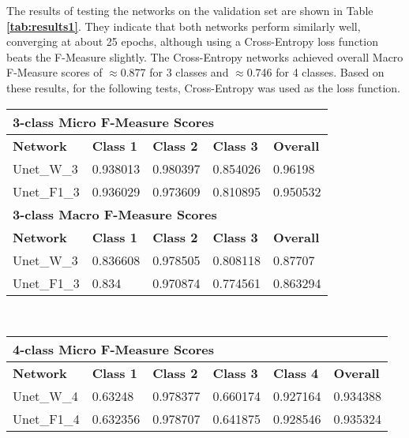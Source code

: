 \noindent The results of testing the networks on the validation set are shown in Table \textbf{\ref{tab:results1}}. They indicate that both networks perform similarly well, converging at about 25 epochs, although using a Cross-Entropy loss function beats the F-Measure slightly. The Cross-Entropy networks achieved overall Macro F-Measure scores of $\approx$0.877 for 3 classes and $\approx$0.746 for 4 classes. Based on these results, for the following tests, Cross-Entropy was used as the loss function.\\ 

\begin {table}
	\begin{flushleft}
		\begin {tabular}[!ht]{|l|l|l|l|l|}
			\hline\multicolumn{5}{|l|}{\textbf{3-class Micro F-Measure Scores}} \\ \hline
			\textbf{Network}& \textbf{Class 1}& \textbf{Class 2}& \textbf{Class 3}& \textbf{Overall} \\ \hline
			Unet\_W\_3& \cellcolor{green!25}0.938013& \cellcolor{green!25}0.980397& \cellcolor{green!25}0.854026& \cellcolor{green!25}0.96198 \\ \hline
			Unet\_F1\_3& 0.936029& 0.973609& 0.810895&  0.950532\\ \hline
			\multicolumn{5}{|l|}{\textbf{3-class Macro F-Measure Scores}} \\ \hline
			\textbf{Network}& \textbf{Class 1}& \textbf{Class 2}& \textbf{Class 3}& \textbf{Overall} \\ \hline
			Unet\_W\_3& \cellcolor{green!25}0.836608& \cellcolor{green!25}0.978505& \cellcolor{green!25}0.808118& \cellcolor{green!25}0.87707 \\ \hline
			Unet\_F1\_3& 0.834&  0.970874& 0.774561& 0.863294 \\ \hline
		\end {tabular}
		\vspace{0.5cm}\\
		\begin {tabular}[!ht]{|l|l|l|l|l|l|}
			\hline\multicolumn{6}{|l|}{\textbf{4-class Micro F-Measure Scores}} \\ \hline
			\textbf{Network}& \textbf{Class 1}& \textbf{Class 2}& \textbf{Class 3}& \textbf{Class 4}& \textbf{Overall} \\ \hline
			Unet\_W\_4& \cellcolor{green!25}0.63248& 0.978377& \cellcolor{green!25}0.660174& 0.927164& 0.934388 \\ \hline
			Unet\_F1\_4& 0.632356& \cellcolor{green!25}0.978707& 0.641875& \cellcolor{green!25}0.928546& \cellcolor{green!25}0.935324 \\ \hline

\end{tabular}
\end{flushleft}
\end{table}
